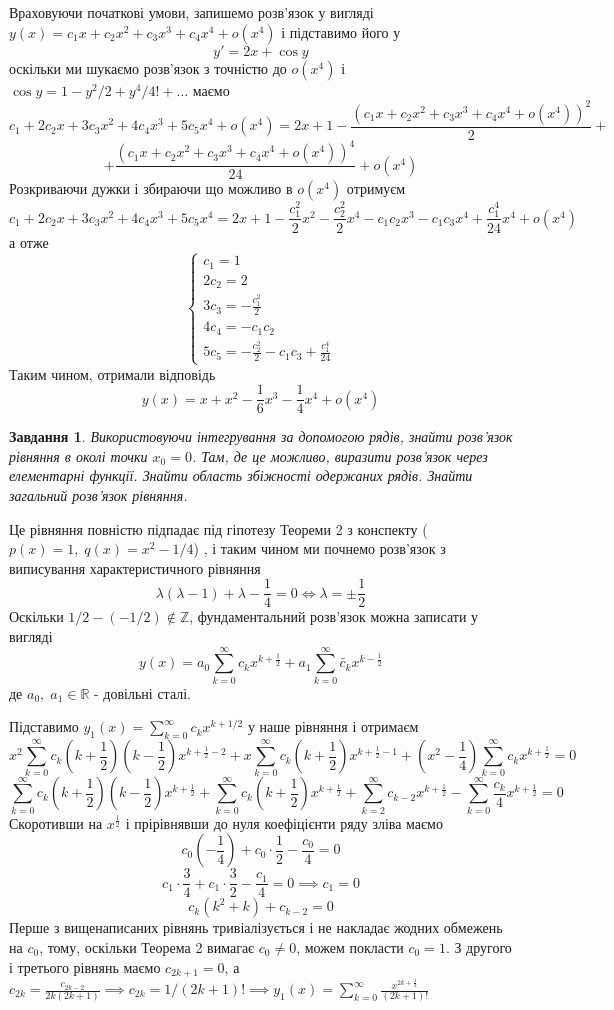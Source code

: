 \documentclass[12pt]{article} %
\newtheorem{prob}{Завдання}
\begin{document}
Враховуючи початкові умови, запишемо розв’язок у вигляді $y(x)=c_1 x+c_2 x^2+c_3x^3+c_4x^4+o(x^4)$ і підставимо його у 
\[y'=2x+\cos y\]
оскільки ми шукаємо розв’язок з точністю до $o(x^4)$ і $\cos y=1-y^2/2+y^4/4!+\dots$ маємо
\[c_1+2c_2x+3c_3x^2+4c_4x^3+5c_5x^4+o(x^4)=2x+1-\frac{(c_1 x+c_2 x^2+c_3x^3+c_4x^4+o(x^4))^2}{2}+\]
\[+\frac{(c_1 x+c_2 x^2+c_3x^3+c_4x^4+o(x^4))^4}{24}+o(x^4)\]
Розкриваючи дужки і збираючи що можливо в $o(x^4)$ отримуєм
\[c_1+2c_2x+3c_3x^2+4c_4x^3+5c_5x^4=2x+1-\frac{c_1^2}{2}x^2-\frac{c_2^2}{2}x^4-c_1c_2x^3-c_1c_3x^4+\frac{c_1^4}{24}x^4+o(x^4)\]
а отже
\[\begin{cases}
	c_1=1\\
	2c_2=2\\
	3c_3=-\frac{c_1^2}{2}\\
	4c_4=-c_1c_2\\
	5c_5=-\frac{c_2^2}{2}-c_1c_3+\frac{c_1^4}{24}
\end{cases}
\]
Таким чином, отримали відповідь
\[y(x)=x+x^2-\frac{1}{6}x^3-\frac{1}{4}x^4+o(x^4)\]
\begin{prob}Використовуючи інтегрування за допомогою рядів, знайти розв’язок рівняння в околі точки  $x_0=0$. Там, де це можливо,
виразити розв’язок через елементарні функції. Знайти область збіжності одержаних рядів. Знайти загальний розв’язок рівняння.\end{prob}
	Це рівняння повністю підпадає під гіпотезу Теореми 2 з конспекту ($p(x)=1,\;q(x)=x^2-1/4$)
	, і таким чином ми почнемо розв’язок з виписування характеристичного рівняння
	\[\lambda(\lambda-1)+\lambda-\frac{1}{4}=0\iff \lambda=\pm\frac{1}{2}\]
	Оскільки $1/2-(-1/2)\notin\mathbb{Z}$, фундаментальний розв’язок можна записати у вигляді
	\[y(x)=a_0\sum_{k=0}^{\infty}c_k x^{k+\frac{1}{2}}+a_1\sum_{k=0}^{\infty}\tilde{c_k}x^{k-\frac{1}{2}}\]
	де $a_0,\;a_1\in\mathbb{R}$ - довільні сталі. 
	
	Підставимо $y_1(x)=\sum_{k=0}^{\infty}c_kx^{k+1/2}$ у наше рівняння і отримаєм
	\[x^2\sum_{k=0}^{\infty}c_k\left(k+\frac{1}{2}\right)
	\left(k-\frac{1}{2}\right)x^{k+\frac{1}{2}-2}
+x\sum_{k=0}^{\infty}c_k\left(k+\frac{1}{2}\right)x^{k+\frac{1}{2}-1}+\left(x^2-\frac{1}{4}\right)\sum_{k=0}^{\infty}c_kx^{k+\frac{1}{2}}=0\]
	\[\sum_{k=0}^{\infty}c_k\left(k+\frac{1}{2}\right)
	\left(k-\frac{1}{2}\right)x^{k+\frac{1}{2}}+\sum_{k=0}^{\infty}c_k\left(k+\frac{1}{2}\right)
	x^{k+\frac{1}{2}}+\sum_{k=2}^{\infty}c_{k-2}x^{k+\frac{1}{2}}-\sum_{k=0}^{\infty}\frac{c_k}{4}x^{k+\frac{1}{2}}=0\]
	Скоротивши на $x^{\frac{1}{2}}$ і прірівнявши до нуля коефіцієнти ряду зліва маємо
	\[c_0\left(-\frac{1}{4}\right)+c_0\cdot\frac{1}{2}-\frac{c_0}{4}=0\]
	\[c_1\cdot\frac{3}{4}+c_1\cdot\frac{3}{2}-\frac{c_1}{4}=0\implies c_1=0\]
	\[c_k(k^2+k)+c_{k-2}=0\]
	Перше з вищенаписаних рівнянь тривіалізується і не накладає жодних обмежень на $c_0$, тому, оскільки Теорема 2 вимагає $c_0\neq 0$,
	можем покласти $c_0=1$. З другого і третього рівнянь маємо $c_{2k+1}=0$, а $c_{2k}=\frac{c_{2k-2}}{2k(2k+1)}\implies
	c_{2k}=1/(2k+1)!\implies y_1(x)=\sum_{k=0}^{\infty}\frac{x^{2k+\frac{1}{2}}}{(2k+1)!}$
\end{document}
